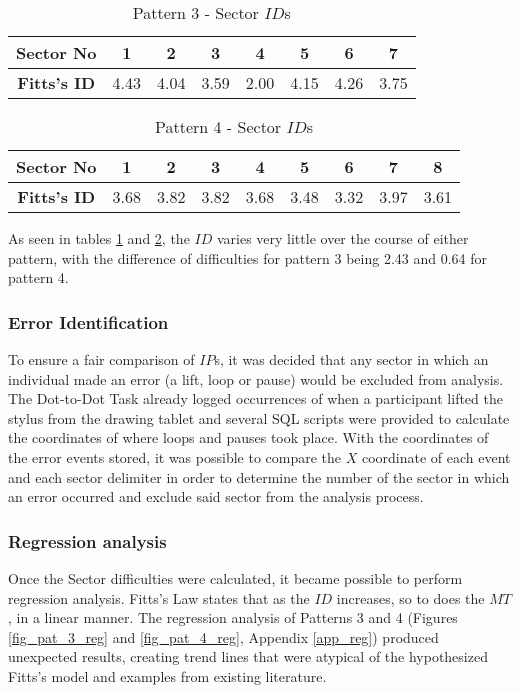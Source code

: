 			\begin{table}[h]
				\centering
				\caption{Pattern 3 - Sector \(ID\)s}
				\label{tab_pat_3_id}
				\begin{tabular}{|c|c|c|c|c|c|c|c|}
					\hline
					\textbf{Sector No}  & 1    & 2    & 3    & 4    & 5    & 6    & 7    \\ \hline
					\textbf{Fitts's ID} & 4.43 & 4.04 & 3.59 & 2.00 & 4.15 & 4.26 & 3.75 \\ \hline
				\end{tabular}
			\end{table}
			
			\begin{table}[h]
				\centering
				\caption{Pattern 4 - Sector \(ID\)s}
				\label{tab_pat_4_id}
				\begin{tabular}{|c|c|c|c|c|c|c|c|c|}
					\hline
					\textbf{Sector No}  & 1    & 2    & 3    & 4    & 5    & 6    & 7    & 8    \\ \hline
					\textbf{Fitts's ID} & 3.68 & 3.82 & 3.82 & 3.68 & 3.48 & 3.32 & 3.97 & 3.61 \\ \hline
				\end{tabular}
			\end{table}
						
			As seen in tables \ref{tab_pat_3_id} and \ref{tab_pat_4_id}, the \(ID\) varies very little over the course of either pattern, with the difference of difficulties for pattern 3 being 2.43 and 0.64 for pattern 4.
			
		\subsubsection{Error Identification}
			To ensure a fair comparison of \(IP\)s, it was decided that any sector in which an individual made an error (a lift, loop or pause) would be excluded from analysis. The Dot-to-Dot Task already logged occurrences of when a participant lifted the stylus from the drawing tablet and several SQL scripts were provided to calculate the coordinates of where loops and pauses took place. With the coordinates of the error events stored, it was possible to compare the \(X\) coordinate of each event and each sector delimiter in order to determine the number of the sector in which an error occurred and exclude said sector from the analysis process. 
			
		\subsubsection{Regression analysis}
			Once the Sector difficulties were calculated, it became possible to perform regression analysis. Fitts’s Law states that as the \(ID\) increases, so to does the \(MT\), in a linear manner.  The regression analysis of Patterns 3 and 4 (Figures \ref{fig_pat_3_reg} and \ref{fig_pat_4_reg}, Appendix \ref{app_reg}) produced unexpected results, creating trend lines that were atypical of the hypothesized Fitts’s model and examples from existing literature.
			
